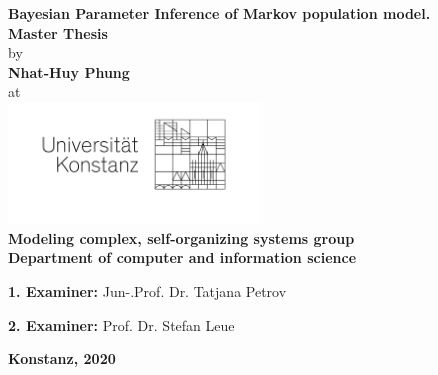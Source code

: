 \begin{titlepage}
  \begin{center}
    {\LARGE \textbf{Bayesian Parameter Inference of Markov population model.}}
    \\[1cm]
    {\Large \textbf{Master Thesis}}
    \\[1cm]
    {\Large by}
    \\[0.5cm]
    {\LARGE \textbf{Nhat-Huy Phung}}
    \\[0.5cm]
    {\Large at}
    \\[0.5cm]
    \includegraphics[width=0.5\textwidth]{figures/unisignet-klein.jpg}
    \\[1cm]
    {\large \textbf{Modeling complex, self-organizing systems group}}
    \\[1cm]
    {\large \textbf{Department of computer and information science}}
    \\[2cm]
    \begin{minipage}[c]{0.8\textwidth}
      \begin{description}[style=multiline]
      \item { \large \textbf{1. Examiner:} Jun-.Prof. Dr. Tatjana Petrov }
      \item { \large \textbf{2. Examiner:} Prof. Dr. Stefan Leue }
      \end{description}
    \end{minipage}
    \vfill
    {\LARGE \textbf{Konstanz, 2020}}
  \end{center}
\end{titlepage}